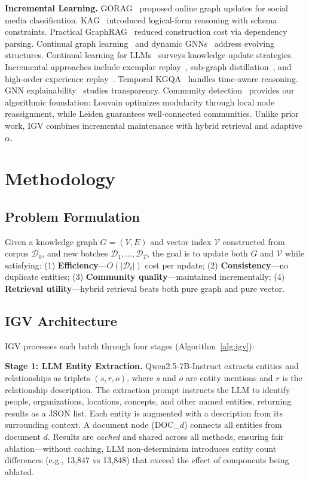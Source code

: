 \documentclass[sigconf,anonymous,review]{acmart}
\begin{document}
\textbf{Incremental Learning.} GORAG~\cite{wang2025gorag} proposed online graph updates for social media classification. KAG~\cite{liang2024kag} introduced logical-form reasoning with schema constraints. Practical GraphRAG~\cite{min2025practical} reduced construction cost via dependency parsing. Continual graph learning~\cite{yuan2026continual} and dynamic GNNs~\cite{zheng2024dynamic} address evolving structures. Continual learning for LLMs~\cite{wu2024continual} surveys knowledge update strategies. Incremental approaches include exemplar replay~\cite{zhang2024influential}, sub-graph distillation~\cite{fan2024dynamic}, and high-order experience replay~\cite{wang2024continual}. Temporal KGQA~\cite{gao2024twostage,qian2024timer} handles time-aware reasoning. GNN explainability~\cite{longa2024explaining} studies transparency. Community detection~\cite{blondel2008louvain,traag2019leiden} provides our algorithmic foundation: Louvain optimizes modularity through local node reassignment, while Leiden guarantees well-connected communities. Unlike prior work, IGV combines incremental maintenance with hybrid retrieval and adaptive $\alpha$.

\section{Methodology}

\subsection{Problem Formulation}

Given a knowledge graph $G=(V,E)$ and vector index $\mathcal{V}$ constructed from corpus $\mathcal{D}_0$, and new batches $\mathcal{D}_1,\ldots,\mathcal{D}_T$, the goal is to update both $G$ and $\mathcal{V}$ while satisfying: (1) \textbf{Efficiency}---$O(|\mathcal{D}_t|)$ cost per update; (2) \textbf{Consistency}---no duplicate entities; (3) \textbf{Community quality}---maintained incrementally; (4) \textbf{Retrieval utility}---hybrid retrieval beats both pure graph and pure vector.

\subsection{IGV Architecture}

IGV processes each batch through four stages (Algorithm~\ref{alg:igv}):

\textbf{Stage 1: LLM Entity Extraction.} Qwen2.5-7B-Instruct extracts entities and relationships as triplets $(s,r,o)$, where $s$ and $o$ are entity mentions and $r$ is the relationship description. The extraction prompt instructs the LLM to identify people, organizations, locations, concepts, and other named entities, returning results as a JSON list. Each entity is augmented with a description from its surrounding context. A document node (DOC\_$d$) connects all entities from document $d$. Results are \emph{cached} and shared across all methods, ensuring fair ablation---without caching, LLM non-determinism introduces entity count differences (e.g., 13,847 vs 13,848) that exceed the effect of components being ablated.
\end{document}
